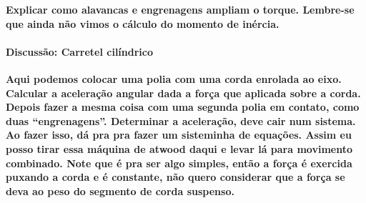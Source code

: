 \textbf{Explicar como alavancas e engrenagens ampliam o torque. Lembre-se que ainda não vimos o cálculo do momento de inércia.}


\paragraph{Discussão: Carretel cilíndrico}

\textbf{Aqui podemos colocar uma polia com uma corda enrolada ao eixo. Calcular a aceleração angular dada a força que aplicada sobre a corda. Depois fazer a mesma coisa com uma segunda polia em contato, como duas ``engrenagens''. Determinar a aceleração, deve cair num sistema. Ao fazer isso, dá pra pra fazer um sisteminha de equações. Assim eu posso tirar essa máquina de atwood daqui e levar lá para movimento combinado. Note que é pra ser algo simples, então a força é exercida puxando a corda e é constante, não quero considerar que a força se deva ao peso do segmento de corda suspenso.}


